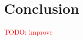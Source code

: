 \documentclass{article} %
\begin{document}




  \section{Conclusion}

  \textcolor{red}{TODO: improve}
  
\end{document}
